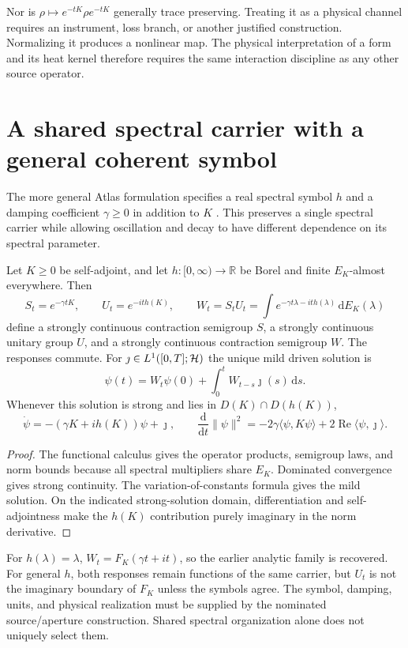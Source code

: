 Nor is $\rho\mapsto e^{-tK}\rho e^{-tK}$ generally trace preserving. Treating it as a physical channel requires an instrument, loss branch, or another justified construction. Normalizing it produces a nonlinear map. The physical interpretation of a form and its heat kernel therefore requires the same interaction discipline as any other source operator.

\section{A shared spectral carrier with a general coherent symbol}\label{section:cscf:a-shared-spectral-carrier-with-a-general-coherent-symbol}
The more general Atlas formulation specifies a real spectral symbol $h$ and a damping coefficient $\gamma\ge0$ in addition to $K$ \cite{RodgersAtlas2026}. This preserves a single spectral carrier while allowing oscillation and decay to have different dependence on its spectral parameter.

\begin{proposition}\label{prop:cscf-general}
Let $K\ge0$ be self-adjoint, and let $h:[0,\infty)\to\mathbb R$ be Borel and finite $E_K$-almost everywhere. Then
\[
 S_t=e^{-\gamma tK},\qquad U_t=e^{-it h(K)},\qquad
 W_t=S_tU_t=\int e^{-\gamma t\lambda-it h(\lambda)}\,\mathrm dE_K(\lambda)
\]
define a strongly continuous contraction semigroup $S$, a strongly continuous unitary group $U$, and a strongly continuous contraction semigroup $W$. The responses commute. For $\jmath\in L^1([0,T];\mathcal H)$ the unique mild driven solution is
\[
 \psi(t)=W_t\psi(0)+\int_0^tW_{t-s}\jmath(s)\,\mathrm ds.
\]
Whenever this solution is strong and lies in $D(K)\cap D(h(K))$,
\[
 \dot\psi=-(\gamma K+i h(K))\psi+\jmath,
 \qquad
 \frac{\mathrm d}{\mathrm dt}\|\psi\|^2
 =-2\gamma\langle\psi,K\psi\rangle
   +2\operatorname{Re}\langle\psi,\jmath\rangle.
\]
\end{proposition}
\begin{proof}
The functional calculus gives the operator products, semigroup laws, and norm bounds because all spectral multipliers share $E_K$. Dominated convergence gives strong continuity. The variation-of-constants formula gives the mild solution. On the indicated strong-solution domain, differentiation and self-adjointness make the $h(K)$ contribution purely imaginary in the norm derivative.
\end{proof}

For $h(\lambda)=\lambda$, $W_t=F_K(\gamma t+it)$, so the earlier analytic family is recovered. For general $h$, both responses remain functions of the same carrier, but $U_t$ is not the imaginary boundary of $F_K$ unless the symbols agree. The symbol, damping, units, and physical realization must be supplied by the nominated source/aperture construction. Shared spectral organization alone does not uniquely select them.

